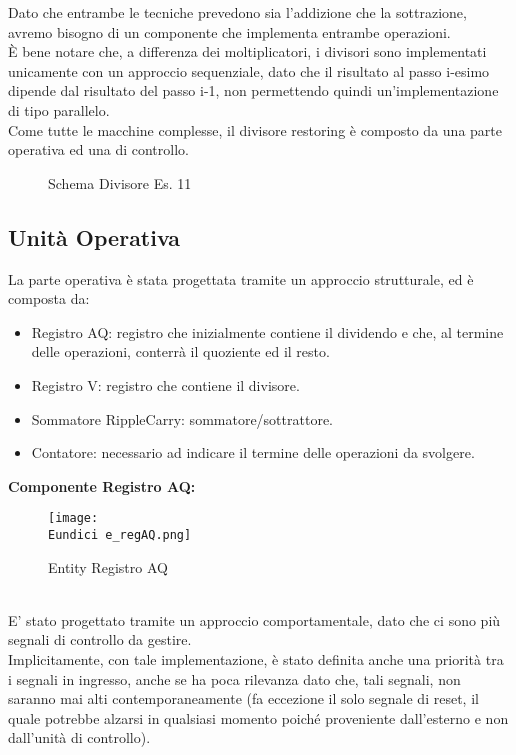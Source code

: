 \documentclass[12pt]{article}
\def \Eundici{Allegati/Esercizio11/}
\begin{document}
Dato che entrambe le tecniche prevedono sia l’addizione che la sottrazione, avremo bisogno di un componente che implementa entrambe operazioni.
\\È bene notare che, a differenza dei moltiplicatori, i divisori sono implementati unicamente con un approccio sequenziale, dato che il risultato al passo i-esimo dipende dal risultato del passo i-1, non permettendo quindi un’implementazione di tipo parallelo.
\\Come tutte le macchine complesse, il divisore restoring è composto da una parte operativa ed una di controllo.
\begin{figure}[ht]
    \centering
    
    \caption{Schema Divisore Es. 11}
\end{figure}
\subsection{Unità Operativa}
La parte operativa è stata progettata tramite un approccio strutturale, ed è composta da:
\begin{itemize}
    \item Registro AQ: registro che inizialmente contiene il dividendo e che, al termine delle operazioni, conterrà il quoziente ed il resto.
    \item Registro V: registro che contiene il divisore.
    \item Sommatore RippleCarry: sommatore/sottrattore.
    \item Contatore: necessario ad indicare il termine delle operazioni da svolgere.
\end{itemize}
\clearpage
{\large \textbf{Componente Registro AQ:}}
\begin{figure}[ht!]
    \centering
    \texttt{[image: \\Eundici e\_regAQ.png]}
    \caption{Entity Registro AQ}
\end{figure}
\vspace*{1cm}
\\E' stato progettato tramite un approccio comportamentale, dato che ci sono più segnali di controllo da gestire.
\\Implicitamente, con tale implementazione, è stato definita anche una priorità tra i segnali in ingresso, anche se ha poca rilevanza dato che, tali segnali, non saranno mai alti contemporaneamente (fa eccezione il solo segnale di reset, il quale potrebbe alzarsi in qualsiasi momento poiché proveniente dall’esterno e non dall’unità di controllo).
\end{document}
